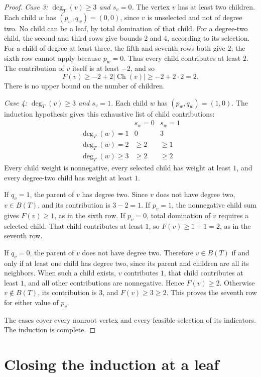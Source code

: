 \documentclass[11pt,a4paper]{article}
\theoremstyle{remark}
\newcommand{\BB}{B}
\newcommand{\ch}{\operatorname{Ch}}
\begin{document}
\begin{proof}
\smallskip\noindent\emph{Case 3: $\deg_T(v)\ge 3$ and $s_v=0$.}
The vertex $v$ has at least two children. Each child $w$ has
$(p_w,q_w)=(0,0)$, since $v$ is unselected and not of degree two.
No child can be a leaf, by total domination of that child.
For a degree-two child, the second and third rows give bounds $2$
and $4$, according to its selection. For a child of degree at least
three, the fifth and seventh rows both give $2$; the sixth row
cannot apply because $p_w=0$. Thus every child contributes at least
$2$. The contribution of $v$ itself is at least $-2$, and so
\[
 F(v)\ge -2+2|\ch(v)|\ge -2+2\cdot 2=2.
\]
There is no upper bound on the number of children.

\smallskip\noindent\emph{Case 4: $\deg_T(v)\ge 3$ and $s_v=1$.}
Each child $w$ has $(p_w,q_w)=(1,0)$. The induction hypothesis
gives this exhaustive list of child contributions:
\[
\begin{array}{c|cc}
 &s_w=0&s_w=1\\ \hline
\deg_T(w)=1&0&3\\
\deg_T(w)=2&\ge 2&\ge 1\\
\deg_T(w)\ge 3&\ge 2&\ge 2
\end{array}
\]
Every child weight is nonnegative, every selected child has weight
at least $1$, and every degree-two child has weight at least $1$.

If $q_v=1$, the parent of $v$ has degree two. Since $v$ does
not have degree two, $v\in\BB(T)$, and its contribution is
$3-2=1$. If $p_v=1$, the nonnegative child sum gives $F(v)\ge 1$,
as in the sixth row. If $p_v=0$, total domination of $v$ requires
a selected child. That child contributes at least $1$, so
$F(v)\ge 1+1=2$, as in the seventh row.

If $q_v=0$, the parent of $v$ does not have degree two.
Therefore $v\in\BB(T)$ if and only if at least one child has degree
two, since its parent and children are all its neighbors.
When such a child exists, $v$ contributes $1$, that child contributes
at least $1$, and all other contributions are nonnegative.
Hence $F(v)\ge 2$. Otherwise $v\notin\BB(T)$, its contribution is
$3$, and $F(v)\ge 3\ge 2$. This proves the seventh row for either
value of $p_v$.

The cases cover every nonroot vertex and every feasible selection
of its indicators. The induction is complete.
\end{proof}

\section{Closing the induction at a leaf}
\label{sec:root}
\end{document}
